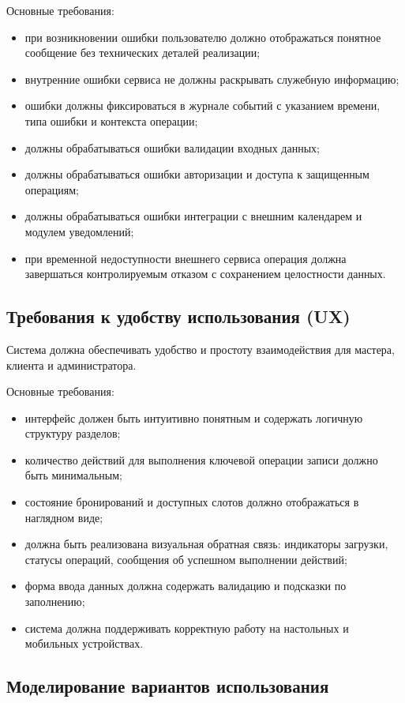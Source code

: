 Основные требования:
\begin{itemize}
\item при возникновении ошибки пользователю должно отображаться понятное сообщение без технических деталей реализации;
\item внутренние ошибки сервиса не должны раскрывать служебную информацию;
\item ошибки должны фиксироваться в журнале событий с указанием времени, типа ошибки и контекста операции;
\item должны обрабатываться ошибки валидации входных данных;
\item должны обрабатываться ошибки авторизации и доступа к защищенным операциям;
\item должны обрабатываться ошибки интеграции с внешним календарем и модулем уведомлений;
\item при временной недоступности внешнего сервиса операция должна завершаться контролируемым отказом с сохранением целостности данных.
\end{itemize}

\subsection{Требования к удобству использования (UX)}

Система должна обеспечивать удобство и простоту взаимодействия для мастера, клиента и администратора.

Основные требования:
\begin{itemize}
\item интерфейс должен быть интуитивно понятным и содержать логичную структуру разделов;
\item количество действий для выполнения ключевой операции записи должно быть минимальным;
\item состояние бронирований и доступных слотов должно отображаться в наглядном виде;
\item должна быть реализована визуальная обратная связь: индикаторы загрузки, статусы операций, сообщения об успешном выполнении действий;
\item форма ввода данных должна содержать валидацию и подсказки по заполнению;
\item система должна поддерживать корректную работу на настольных и мобильных устройствах.
\end{itemize}

\subsection{Моделирование вариантов использования}

